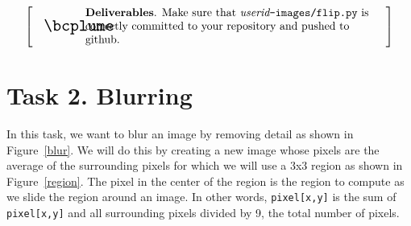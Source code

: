 \documentclass[titlepage]{tufte-book}
\makeatletter
\newcounter{total}
\newcommand{\figref}[1]{Figure~\ref{#1}}
\newenvironment{callout}[1]{
\[
  \left[
      \begin{tabular}{@{\quad}m{.05\textwidth}@{\qquad}m{.75\textwidth}@{\quad}}
        \scalebox{1.5}{#1} & 
          \raggedright%
}
{
      \end{tabular}
    \right]
\]
}
\makeatother
\begin{document}
\begin{callout}{\bcplume}
{\bf Deliverables}. Make sure that {\em userid}{\tt -images/flip.py} is correctly committed to your repository and pushed to github. 
\end{callout}

\section{Task 2. Blurring}

In this task, we want to blur an image by removing detail as shown in \figref{blur}. We will do this by creating a new image whose pixels are the average of the surrounding pixels for which we will use a 3x3 region as shown in \figref{region}. The pixel in the center of the region is the region to compute as we slide the region around an image. In other words, {\tt pixel[x,y]} is the sum of {\tt pixel[x,y]} and all surrounding pixels divided by 9, the total number of pixels.

\begin{marginfigure}
\begin{center}
\\
\end{center}
\label{blur}
\end{marginfigure}
\end{document}
